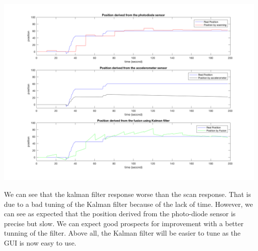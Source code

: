 \documentclass{vldb}
\begin{document}
\includegraphics[width=1.0\columnwidth]{Image/graphes2.png}

We can see that the kalman filter response worse than the scan response. That is due to a bad tuning of the Kalman filter because of the lack of time. However, we can see as expected that the position derived from the photo-diode sensor is precise but slow. We can expect good prospects for improvement with a better tunning of the filter. Above all, the Kalman filter will be easier to tune as the GUI is now easy to use. 







\end{document}
